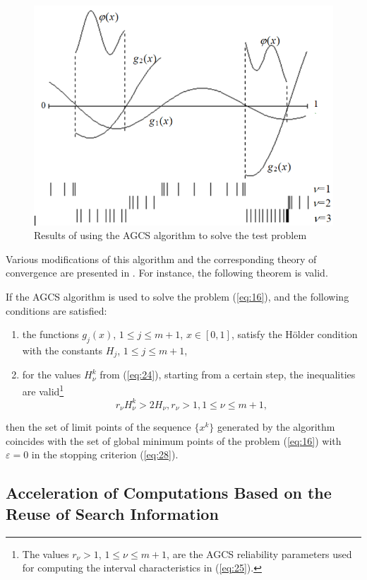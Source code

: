 \documentclass[smallextended]{svjour3}       %
\begin{document}
\begin{figure}
  \centering
  \includegraphics[width=0.6\linewidth]{fig2}
  \caption{Results of using the AGCS algorithm to solve the test problem}
  \label{fig:2}
\end{figure}

Various modifications of this algorithm and the corresponding theory of convergence are presented in \cite{c18}. For instance, the following theorem is valid.

\begin{theorem}
If the AGCS algorithm is used to solve the problem (\ref{eq:16}), and the following conditions are satisfied:
\begin{enumerate}
	\item the functions $g_j(x)$, $1 \leq j \leq m+1$, $x\in[0,1]$, satisfy the H\"older condition with the constants $H_j$, $1 \leq j \leq m+1$,
	\item for the values $H^k_\nu$ from (\ref{eq:24}), starting from a certain step, the inequalities are valid\footnote{The values $r_{\nu} > 1$, $1 \leq \nu \leq m+1$, are the AGCS reliability parameters used for computing the interval characteristics in (\ref{eq:25}).}
\begin{equation} \label{eq:29}
r_\nu H^k_\nu > 2H_\nu, r_\nu > 1, 1 \leq \nu \leq m+1,
\end{equation}
\end{enumerate}
then the set of limit points of the sequence $\{x^k\}$ generated by the algorithm coincides with the set of global minimum points of the problem (\ref{eq:16}) with $\varepsilon=0$ in the stopping criterion (\ref{eq:28}).
\end{theorem}

\subsection{Acceleration of Computations Based on the Reuse of Search Information}
\end{document}
